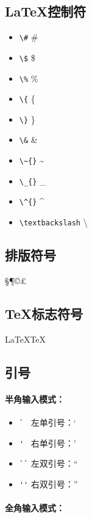  \subsection{\LaTeX 控制符}
 \begin{itemize}
    \item \verb|\#| \qquad \#
    \item \verb|\$| \qquad \$
    \item \verb|\%| \qquad \%
    \item \verb|\{| \qquad \{
    \item \verb|\}| \qquad \}
    \item \verb|\&| \qquad \&
    \item \verb|\~{}| \quad \~{}
    \item \verb|\_{}| \quad \_{}
    \item \verb|\^{}| \quad \^{}
    \item \verb|\textbackslash| \qquad \textbackslash
 \end{itemize}

 \subsection{排版符号}
 \S \P \dag \ddag \copyright \pounds

 \subsection{\TeX 标志符号}
 \LaTeX \TeX{}  \LaTeXe{}

 \subsection{引号}

 \paragraph*{半角输入模式：}

 \begin{itemize}
    \item \verb|`| \ \quad 左单引号：`        %
    \item \verb|'|  \ \quad 右单引号：' 
    \item \verb|``| \quad 左双引号：`` 
    \item \verb|''| \quad 右双引号：'' 
 \end{itemize}

 \paragraph*{全角输入模式：}

